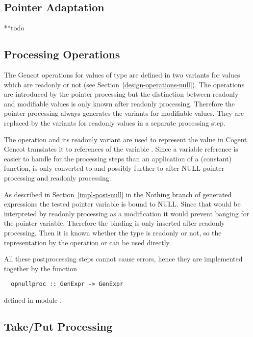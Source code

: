 \subsection{Pointer Adaptation}
\label{impl-post-pointer}

**todo 

\subsection{Processing  Operations}
\label{impl-post-opnull}

The Gencot operations for values of  type are defined in two variants for values which are readonly or not (see Section~\ref{design-operations-null}). The operations are introduced by the  pointer processing but the distinction
between readonly and modifiable values is only known after readonly processing. Therefore the  pointer processing
always generates the variants for modifiable values. They are replaced by the variants for readonly values in a separate
processing step.

The operation  and its readonly variant  are used to represent the value  in Cogent.
Gencot translates it to references of the variable . Since a variable reference is easier to handle
for the processing steps than an application of a (constant) function,  is only converted to 
and possibly further to  after NULL pointer processing and readonly processing.

As described in Section~\ref{impl-post-null} in the Nothing branch of generated  expressions the tested pointer
variable is bound to NULL. Since that would be interpreted by readonly processing as a modification it would prevent
banging for the pointer variable. Therefore the binding is only inserted after readonly processing. Then it is known
whether the type is readonly or not, so the representation by the operation  or  can be used directly.

All these postprocessing steps cannot cause errors, hence they are implemented together by the function

\begin{verbatim}
  opnullproc :: GenExpr -> GenExpr
\end{verbatim}
defined in module .

\subsection{Take/Put Processing}
\label{impl-post-takeput}

